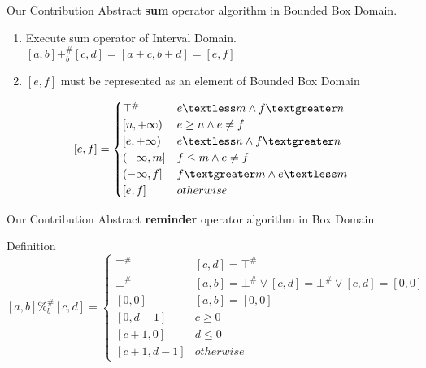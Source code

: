 \documentclass{beamer}
\begin{document}
	\begin{frame}{Our Contribution}
		Abstract \textbf{sum} operator algorithm in Bounded Box Domain. 
		\begin{enumerate}
			\item Execute sum operator of Interval Domain. \\
			$[a,b] +_{b}^\# [c,d] = [a + c,b + d] = [e,f]$
			\item $[e,f]$ must be represented as an element of Bounded Box Domain
		\end{enumerate}
	\[ [e,f] =
	\begin{cases} 
	\top^\# & e \textless m \land f \textgreater n\\
	[n,+\infty) & e \geq n  \land  e \neq f\\
	[e,+\infty) & e \textless n \land f \textgreater n\\
	(-\infty,m] & f \leq m \land e \neq f\\
	(-\infty,f] & f \textgreater m \land e \textless m \\
	[e,f] & otherwise
	\end{cases}
	\]
		
	\end{frame}
	\begin{frame}{Our Contribution}
	Abstract \textbf{reminder} operator algorithm in Box Domain
		\begin{block}{Definition}
		\scriptsize	
		\[ [a,b] \%_{b}^\# [c,d] =
		\begin{cases}
		\top^\# & [c,d] = \top^\# \\
		\bot^\# & [a,b] = \bot^\# \lor [c,d] = \bot^\# \lor [c,d] = [0,0] \\ 
		[0,0] & [a,b] = [0,0] \\
		[0,d-1] & c \geq 0\\
		[c+1,0] & d \leq 0 \\
		[c+1,d-1] & otherwise
		\end{cases}
		\]
		\normalsize
	\end{block}
	
	\end{frame}
\end{document}
